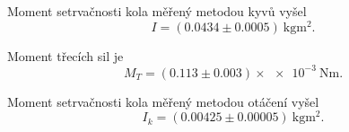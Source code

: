 \documentclass[protokol.tex]{subfiles}
\begin{document}
Moment setrvačnosti kola měřený metodou kyvů vyšel
$$ I = (0.0434 \pm 0.0005) \ \si{\kilo\gram\metre\squared}. $$

Moment třecích sil je 
$$ M_T = (0.113 \pm 0.003) \times \num{e-3} \ \si{\newton\metre}. $$

Moment setrvačnosti kola měřený metodou otáčení vyšel
$$ I_k = (0.00425 \pm 0.00005) \ \si{\kilo\gram\metre\squared}. $$
\end{document}
